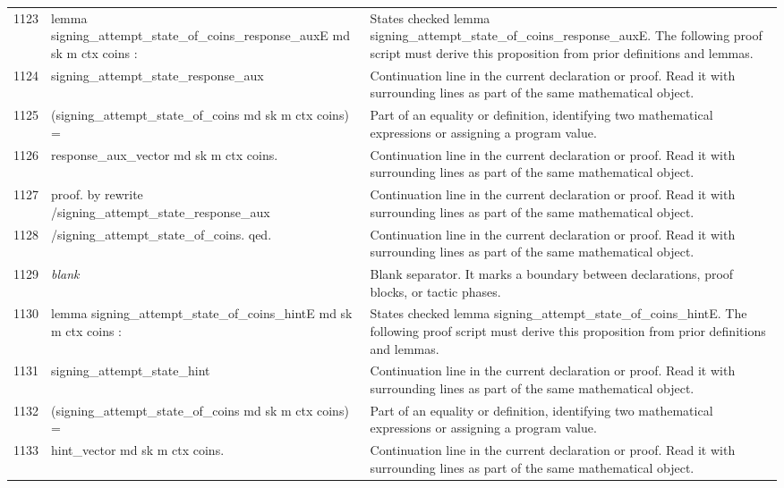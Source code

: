 \documentclass[10pt]{article}
\begin{document}
\begin{longtable}{r L{0.53\textwidth} L{0.37\textwidth}}
1123 & {\ttfamily\scriptsize lemma signing\_attempt\_state\_of\_coins\_response\_auxE md sk m ctx coins :} & States checked lemma signing\_attempt\_state\_of\_coins\_response\_auxE.  The following proof script must derive this proposition from prior definitions and lemmas. \\
1124 & {\ttfamily\scriptsize   signing\_attempt\_state\_response\_aux} & Continuation line in the current declaration or proof.  Read it with surrounding lines as part of the same mathematical object. \\
1125 & {\ttfamily\scriptsize     (signing\_attempt\_state\_of\_coins md sk m ctx coins) =} & Part of an equality or definition, identifying two mathematical expressions or assigning a program value. \\
1126 & {\ttfamily\scriptsize   response\_aux\_vector md sk m ctx coins.} & Continuation line in the current declaration or proof.  Read it with surrounding lines as part of the same mathematical object. \\
1127 & {\ttfamily\scriptsize proof. by rewrite /signing\_attempt\_state\_response\_aux} & Continuation line in the current declaration or proof.  Read it with surrounding lines as part of the same mathematical object. \\
1128 & {\ttfamily\scriptsize                   /signing\_attempt\_state\_of\_coins. qed.} & Continuation line in the current declaration or proof.  Read it with surrounding lines as part of the same mathematical object. \\
1129 & {\ttfamily\scriptsize \emph{blank}} & Blank separator.  It marks a boundary between declarations, proof blocks, or tactic phases. \\
1130 & {\ttfamily\scriptsize lemma signing\_attempt\_state\_of\_coins\_hintE md sk m ctx coins :} & States checked lemma signing\_attempt\_state\_of\_coins\_hintE.  The following proof script must derive this proposition from prior definitions and lemmas. \\
1131 & {\ttfamily\scriptsize   signing\_attempt\_state\_hint} & Continuation line in the current declaration or proof.  Read it with surrounding lines as part of the same mathematical object. \\
1132 & {\ttfamily\scriptsize     (signing\_attempt\_state\_of\_coins md sk m ctx coins) =} & Part of an equality or definition, identifying two mathematical expressions or assigning a program value. \\
1133 & {\ttfamily\scriptsize   hint\_vector md sk m ctx coins.} & Continuation line in the current declaration or proof.  Read it with surrounding lines as part of the same mathematical object. \\

\end{longtable}
\end{document}
